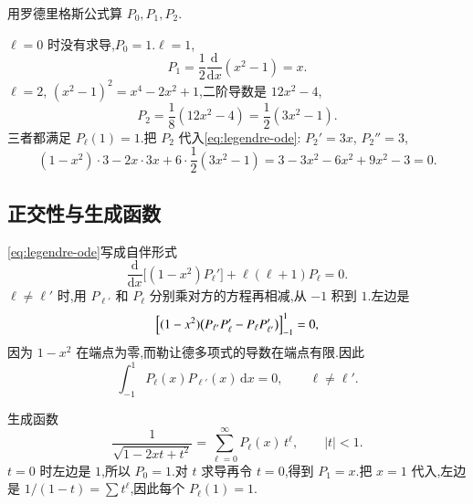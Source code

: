 \begin{example}
用罗德里格斯公式算 $P_0,P_1,P_2$.
\end{example}
\begin{solution}
$\ell=0$ 时没有求导,$P_0=1$.$\ell=1$,
\begin{equation}
  P_1=\frac{1}{2}\frac{\mathrm{d}}{\mathrm{d}x}(x^2-1)=x.
\end{equation}
$\ell=2$, $(x^2-1)^2=x^4-2x^2+1$,二阶导数是 $12x^2-4$,
\begin{equation}
  P_2=\frac{1}{8}(12x^2-4)=\frac{1}{2}(3x^2-1).
\end{equation}
三者都满足 $P_{\ell}(1)=1$.把 $P_2$ 代入\eqref{eq:legendre-ode}: $P_2'=3x$, $P_2''=3$,
\begin{equation}
  (1-x^2)\cdot 3-2x\cdot 3x+6\cdot\frac{1}{2}(3x^2-1)
  =3-3x^2-6x^2+9x^2-3=0.
\end{equation}
\end{solution}

\subsection{正交性与生成函数}
\eqref{eq:legendre-ode}写成自伴形式
\begin{equation}
  \frac{\mathrm{d}}{\mathrm{d}x}\bigl[(1-x^2)P_{\ell}'\bigr]+\ell(\ell+1)P_{\ell}=0.
\end{equation}
$\ell\neq\ell'$ 时,用 $P_{\ell'}$ 和 $P_{\ell}$ 分别乘对方的方程再相减,从 $-1$ 积到 $1$.左边是
\begin{equation}
  \Bigl[(1-x^2)\bigl(P_{\ell'}P_{\ell}'-P_{\ell}P_{\ell'}'\bigr)\Bigr]_{-1}^{1}=0,
\end{equation}
因为 $1-x^2$ 在端点为零,而勒让德多项式的导数在端点有限.因此
\begin{equation}
  \int_{-1}^{1} P_{\ell}(x)P_{\ell'}(x)\,\mathrm{d}x=0,
  \qquad\ell\neq\ell'.
\end{equation}

生成函数
\begin{equation}
  \frac{1}{\sqrt{1-2xt+t^2}}
  =\sum_{\ell=0}^{\infty} P_{\ell}(x)\, t^{\ell},
  \qquad |t|<1.
  \label{eq:legendre-generating}
\end{equation}
$t=0$ 时左边是 $1$,所以 $P_0=1$.对 $t$ 求导再令 $t=0$,得到 $P_1=x$.把 $x=1$ 代入,左边是 $1/(1-t)=\sum t^{\ell}$,因此每个 $P_{\ell}(1)=1$.

